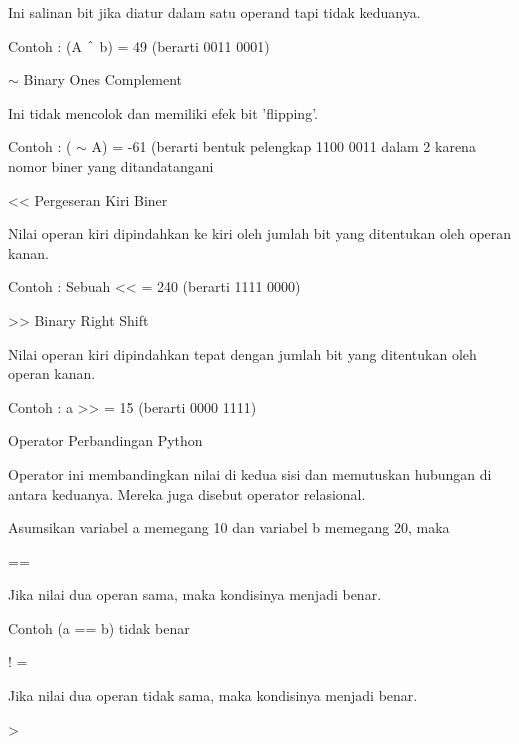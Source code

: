 \noindent
Ini salinan bit jika diatur dalam satu operand tapi tidak keduanya. \par
\noindent
Contoh : (A  $  \string^  $ b) = 49 (berarti 0011 0001) \par
\vspace{12pt}
\noindent
 $  \sim  $ Binary Ones Complement \par
\noindent
Ini tidak mencolok dan memiliki efek bit 'flipping'. \par
\noindent
Contoh : ( $  \sim  $ A) = -61 (berarti bentuk pelengkap 1100 0011 dalam 2 karena nomor biner yang ditandatangani \par
\vspace{12pt}
\noindent
<< Pergeseran Kiri Biner \par
\noindent
Nilai operan kiri dipindahkan ke kiri oleh jumlah bit yang ditentukan oleh operan kanan. \par
\noindent
Contoh : Sebuah << = 240 (berarti 1111 0000) \par
\vspace{12pt}
\noindent
>> Binary Right Shift \par
\noindent
Nilai operan kiri dipindahkan tepat dengan jumlah bit yang ditentukan oleh operan kanan. \par
\noindent
Contoh : a >> = 15 (berarti 0000 1111) \par
\vspace{12pt}
\noindent
Operator Perbandingan Python \par
\vspace{12pt}
\noindent
Operator ini membandingkan nilai di kedua sisi dan memutuskan hubungan di antara keduanya. $  $Mereka juga disebut operator relasional. \par
\vspace{12pt}
\noindent
Asumsikan variabel a memegang 10 dan variabel b memegang 20, maka  \par
\vspace{12pt}
\noindent
== \par
\noindent
Jika nilai dua operan sama, maka kondisinya menjadi benar. \par
\noindent
Contoh (a == b) tidak benar \par
\vspace{12pt}
\noindent
! = \par
\noindent
Jika nilai dua operan tidak sama, maka kondisinya menjadi benar. \par
\vspace{12pt}
\noindent
> \par
